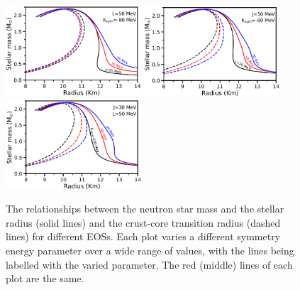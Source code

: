 \documentclass[fleqn,usenatbib]{mnras}
\begin{document}
\begin{figure}
\centering
\includegraphics[width=0.45\textwidth,angle=0]{MRs_Jvals_full.png}
\includegraphics[width=0.45\textwidth,angle=0]{MRs_Lvals_full.png}
\includegraphics[width=0.45\textwidth,angle=0]{MRs_Kvals_full.png}
\caption{The relationships between the neutron star mass and the stellar radius (solid lines) and the crust-core transition radius (dashed lines) for different EOSs. Each plot varies a different symmetry energy parameter over a wide range of values, with the lines being labelled with the varied parameter. The red (middle) lines of each plot are the same.}
\label{fig:MR_JLK}
\end{figure}


\end{document}

